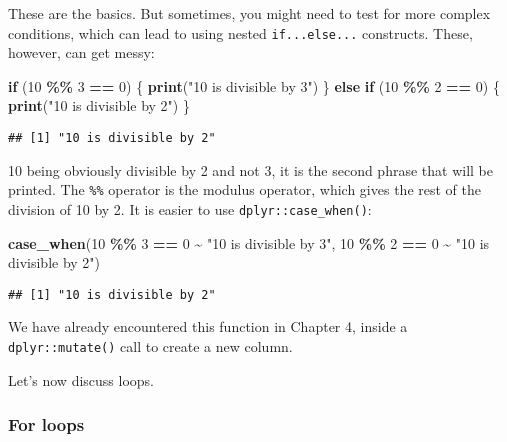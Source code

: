\documentclass[
]{article}
\newenvironment{Shaded}{\begin{snugshade}}{\end{snugshade}}
\newcommand{\ControlFlowTok}[1]{\textcolor[rgb]{0.13,0.29,0.53}{\textbf{#1}}}
\newcommand{\DecValTok}[1]{\textcolor[rgb]{0.00,0.00,0.81}{#1}}
\newcommand{\KeywordTok}[1]{\textcolor[rgb]{0.13,0.29,0.53}{\textbf{#1}}}
\newcommand{\NormalTok}[1]{#1}
\newcommand{\OperatorTok}[1]{\textcolor[rgb]{0.81,0.36,0.00}{\textbf{#1}}}
\newcommand{\StringTok}[1]{\textcolor[rgb]{0.31,0.60,0.02}{#1}}
\begin{document}
These are the basics. But sometimes, you might need to test for more complex conditions, which can
lead to using nested \texttt{if...else...} constructs. These, however, can get messy:

\begin{Shaded}
\begin{Highlighting}[]
\ControlFlowTok{if}\NormalTok{ (}\DecValTok{10} \OperatorTok{\%\%}\StringTok{ }\DecValTok{3} \OperatorTok{==}\StringTok{ }\DecValTok{0}\NormalTok{) \{}
  \KeywordTok{print}\NormalTok{(}\StringTok{"10 is divisible by 3"}\NormalTok{)}
\NormalTok{  \} }\ControlFlowTok{else} \ControlFlowTok{if}\NormalTok{ (}\DecValTok{10} \OperatorTok{\%\%}\StringTok{ }\DecValTok{2} \OperatorTok{==}\StringTok{ }\DecValTok{0}\NormalTok{) \{}
    \KeywordTok{print}\NormalTok{(}\StringTok{"10 is divisible by 2"}\NormalTok{)}
\NormalTok{\}}
\end{Highlighting}
\end{Shaded}

\begin{verbatim}
## [1] "10 is divisible by 2"
\end{verbatim}

10 being obviously divisible by 2 and not 3, it is the second phrase that will be printed. The
\texttt{\%\%} operator is the modulus operator, which gives the rest of the division of 10 by 2.
It is easier to use \texttt{dplyr::case\_when()}:

\begin{Shaded}
\begin{Highlighting}[]
\KeywordTok{case\_when}\NormalTok{(}\DecValTok{10} \OperatorTok{\%\%}\StringTok{ }\DecValTok{3} \OperatorTok{==}\StringTok{ }\DecValTok{0} \OperatorTok{\textasciitilde{}}\StringTok{ "10 is divisible by 3"}\NormalTok{,}
          \DecValTok{10} \OperatorTok{\%\%}\StringTok{ }\DecValTok{2} \OperatorTok{==}\StringTok{ }\DecValTok{0} \OperatorTok{\textasciitilde{}}\StringTok{ "10 is divisible by 2"}\NormalTok{)}
\end{Highlighting}
\end{Shaded}

\begin{verbatim}
## [1] "10 is divisible by 2"
\end{verbatim}

We have already encountered this function in Chapter 4, inside a \texttt{dplyr::mutate()} call to create a new column.

Let's now discuss loops.

\hypertarget{for-loops}{%
\subsubsection{For loops}\label{for-loops}}
\end{document}
